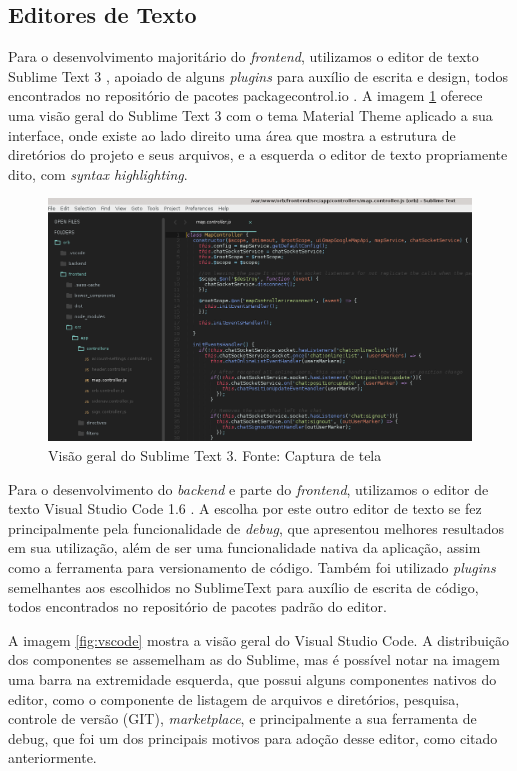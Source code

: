 \subsection{Editores de Texto}
Para o desenvolvimento majoritário do \textit{frontend}, utilizamos o editor de texto Sublime Text 3 \cite{sublime}, apoiado de alguns \textit{plugins} para auxílio de escrita e design, todos encontrados no repositório de pacotes packagecontrol.io \cite{packagecontrolio}. A imagem \ref{fig:sublime3} oferece uma visão geral do Sublime Text 3 com o tema Material Theme aplicado a sua interface, onde existe ao lado direito uma área que mostra a estrutura de diretórios do projeto e seus arquivos, e a esquerda o editor de texto propriamente dito, com \textit{syntax highlighting}.

\begin{figure}[H]
	\centering
	\includegraphics[scale=0.51]{imagens/sublime3.png}
	\caption{\small Visão geral do Sublime Text 3.  Fonte: Captura de tela}
	\label{fig:sublime3}
\end{figure}

Para o desenvolvimento do \textit{backend} e parte do \textit{frontend}, utilizamos o editor de texto Visual Studio Code 1.6 \cite{vscode}. A escolha por este outro editor de texto se fez principalmente pela funcionalidade de \textit{debug}, que apresentou melhores resultados em sua utilização, além de ser uma funcionalidade nativa da aplicação, assim como a ferramenta para versionamento de código. Também foi utilizado \textit{plugins} semelhantes aos escolhidos no SublimeText para auxílio de escrita de código, todos encontrados no repositório de pacotes padrão do editor.

A imagem \ref{fig:vscode} mostra a visão geral do Visual Studio Code. A distribuição dos componentes se assemelham as do Sublime, mas é possível notar na imagem uma barra na extremidade esquerda, que possui alguns componentes nativos do editor, como o componente de listagem de arquivos e diretórios, pesquisa, controle de versão (GIT), \textit{marketplace}, e principalmente a sua ferramenta de debug, que foi um dos principais motivos para adoção desse editor, como citado anteriormente.

